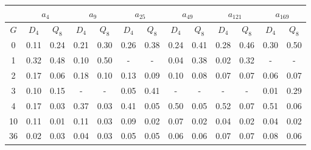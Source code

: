 \begin{table}[h]
   \begin{center}
        \begin{tabular}{c|c|c|c|c|c|c|c|c|c|c|c|c}
            \toprule
            & \multicolumn{2}{c|}{$a_{4}$} & \multicolumn{2}{c|}{$a_{9}$} & \multicolumn{2}{c|}{$a_{25}$} & \multicolumn{2}{c|}{$a_{49}$} & \multicolumn{2}{c|}{$a_{121}$} & \multicolumn{2}{c}{$a_{169}$} \\
            \midrule
            $G$ & $D_{4}$ & $Q_{8}$ & $D_{4}$ & $Q_{8}$ & $D_{4}$ & $Q_{8}$ & $D_{4}$ & $Q_{8}$ & $D_{4}$ & $Q_{8}$ & $D_{4}$ & $Q_{8}$ \\
            \midrule
            0 & 0.11 & 0.24 & 0.21 & 0.30 & 0.26 & 0.38 & 0.24 & 0.41 & 0.28 & 0.46 & 0.30 & 0.50 \\
            1 & 0.32 & 0.48 & 0.10 & 0.50 & - & - & 0.04 & 0.38 & 0.02 & 0.32 & - & - \\
            2 & 0.17 & 0.06 & 0.18 & 0.10 & 0.13 & 0.09 & 0.10 & 0.08 & 0.07 & 0.07 & 0.06 & 0.07 \\
            3 & 0.10 & 0.15 & - & - & 0.05 & 0.41 & - & - & - & - & 0.01 & 0.29 \\
            4 & 0.17 & 0.03 & 0.37 & 0.03 & 0.41 & 0.05 & 0.50 & 0.05 & 0.52 & 0.07 & 0.51 & 0.06 \\
            10 & 0.11 & 0.01 & 0.11 & 0.03 & 0.09 & 0.02 & 0.07 & 0.02 & 0.04 & 0.02 & 0.04 & 0.02 \\
            36 & 0.02 & 0.03 & 0.04 & 0.03 & 0.05 & 0.05 & 0.06 & 0.06 & 0.07 & 0.07 & 0.08 & 0.06 \\
            \bottomrule
        \end{tabular}
   \end{center}
\end{table}
